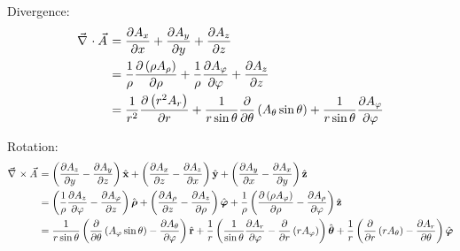 			\noindent
			Divergence:
			\begin{equation}
				\begin{aligned}
					\Nabla\cdot\vec{A} &= \frac{\partial A_x}{\partial x} + \frac{\partial A_y}{\partial y} + \frac{\partial A_z}{\partial z} \\
					&= \frac{1}{\rho}\frac{\partial \left( \rho A_\rho  \right)}{\partial \rho}+ \frac{1}{\rho}\frac{\partial A_\varphi}{\partial \varphi}+ \frac{\partial A_z}{\partial z} \\
					&= \frac{1}{r^2}\frac{\partial \left( r^2 A_r \right)}{\partial r}+ \frac{1}{r\sin\theta}\frac{\partial}{\partial \theta} \left(  A_\theta\sin\theta \right)+ \frac{1}{r\sin\theta}\frac{\partial A_\varphi}{\partial \varphi} \\
				\end{aligned}
			\end{equation}

			\noindent
			Rotation:
			\begin{equation}
				\begin{aligned}
					\Nabla\times\vec{A} &= \left(\frac{\partial A_z}{\partial y} - \frac{\partial A_y}{\partial z}\right) \hat{\mathbf x} + \left(\frac{\partial A_x}{\partial z} - \frac{\partial A_z}{\partial x}\right) \hat{\mathbf y} + \left(\frac{\partial A_y}{\partial x} - \frac{\partial A_x}{\partial y}\right) \hat{\mathbf z} \\
					&= {\displaystyle {\left({\frac {1}{\rho }}{\frac {\partial A_{z}}{\partial \varphi }}-{\frac {\partial A_{\varphi }}{\partial z}}\right){\hat {\boldsymbol {\rho }}}+\left({\frac {\partial A_{\rho }}{\partial z}}-{\frac {\partial A_{z}}{\partial \rho }}\right){\hat {\boldsymbol {\varphi }}}+{\frac {1}{\rho }}\left({\frac {\partial \left(\rho A_{\varphi }\right)}{\partial \rho }}-{\frac {\partial A_{\rho }}{\partial \varphi }}\right){\hat {\mathbf {z} }}}} \\
					&= {\displaystyle {{\frac {1}{r\sin \theta }}\left({\frac {\partial }{\partial \theta }}\left(A_{\varphi }\sin \theta \right)-{\frac {\partial A_{\theta }}{\partial \varphi }}\right){\hat {\mathbf {r} }}+\frac{1}{r}\left({\frac {1}{\sin \theta }}{\frac {\partial A_{r}}{\partial \varphi }}-{\frac {\partial }{\partial r}}\left(rA_{\varphi }\right)\right){\hat {\boldsymbol {\theta }}}+{\frac {1}{r}}\left({\frac {\partial }{\partial r}}\left(rA_{\theta }\right)-{\frac {\partial A_{r}}{\partial \theta }}\right){\hat {\boldsymbol {\varphi }}}}} \\
				\end{aligned}
			\end{equation}

